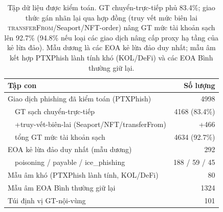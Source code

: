 \documentclass[conference]{IEEEtran}
\begin{document}
\begin{table}[t]\centering\caption{Tập dữ liệu được kiểm toán. GT chuyển-trực-tiếp
phủ 83.4\%; giao thức gán nhãn lại qua hợp đồng (truy vết mức biên lai
\textsc{transferFrom}/Seaport/NFT-order) nâng GT mức tài khoản sạch lên 92.7\%
(94.8\% nếu loại các giao dịch nâng cấp proxy hạ tầng của kẻ lừa đảo). Mẫu dương là
các EOA kẻ lừa đảo duy nhất; mẫu âm kết hợp PTXPhish lành tính khó (KOL/DeFi) và các
EOA Bình thường giữ lại.}\label{tab:data}
\begin{tabular}{lr}\toprule
\textbf{Tập con} & \textbf{Số lượng} \\\midrule
Giao dịch phishing đã kiểm toán (PTXPhish) & 4998 \\
\ \ GT sạch chuyển-trực-tiếp & 4168 (83.4\%) \\
\ \ +truy-vết-biên-lai (Seaport/NFT/transferFrom) & +466 \\
\ \ tổng GT mức tài khoản sạch & 4634 (92.7\%) \\
EOA kẻ lừa đảo duy nhất (mẫu dương) & 292 \\
\ \ poisoning / payable / ice\_phishing & 188 / 59 / 45 \\
Mẫu âm khó (PTXPhish lành tính, KOL/DeFi) & 80 \\
Mẫu âm EOA Bình thường giữ lại & 1324 \\
Túi định vị GT-nội-vùng & 101 \\\bottomrule
\end{tabular}\end{table}
\end{document}
